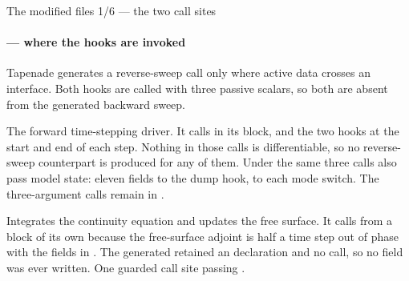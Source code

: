 %
%

\begin{frame}{The modified files 1/6 --- the two call sites}
  \framesubtitle{ --- where the hooks are invoked}

\Gap
Tapenade generates a reverse-sweep call only where active data crosses an
interface. Both hooks are called with three passive scalars, so both are
absent from the generated backward sweep.

{The forward time-stepping driver. It calls  in its
 block, and the two 
hooks at the start and end of each step.}
{Nothing in those calls is differentiable, so no reverse-sweep counterpart is
produced for any of them.}
{Under  the same three calls also pass model state:
eleven fields to the dump hook,  to each mode switch. The
three-argument calls remain in .}

{Integrates the continuity equation and updates the free surface. It calls
 from a block of its own because the free-surface adjoint
is half a time step out of phase with the fields in .}
{The generated  retained an 
declaration and no call, so no  field was ever written.}
{One guarded call site passing .}

\end{frame}


